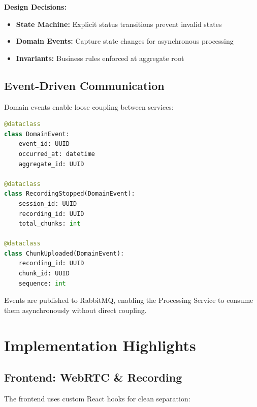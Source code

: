 \documentclass[12pt,a4paper]{article}
\begin{document}
\textbf{Design Decisions:}
\begin{itemize}[noitemsep]
    \item \textbf{State Machine:} Explicit status transitions prevent invalid states
    \item \textbf{Domain Events:} Capture state changes for asynchronous processing
    \item \textbf{Invariants:} Business rules enforced at aggregate root
\end{itemize}

\subsection{Event-Driven Communication}

Domain events enable loose coupling between services:

\begin{lstlisting}[language=Python, caption=Domain Events, basicstyle=\ttfamily\scriptsize]
@dataclass
class DomainEvent:
    event_id: UUID
    occurred_at: datetime
    aggregate_id: UUID

@dataclass
class RecordingStopped(DomainEvent):
    session_id: UUID
    recording_id: UUID
    total_chunks: int

@dataclass
class ChunkUploaded(DomainEvent):
    recording_id: UUID
    chunk_id: UUID
    sequence: int
\end{lstlisting}

Events are published to RabbitMQ, enabling the Processing Service to consume them asynchronously without direct coupling.

\section{Implementation Highlights}

\subsection{Frontend: WebRTC \& Recording}

The frontend uses custom React hooks for clean separation:
\end{document}
